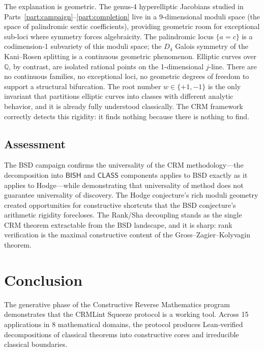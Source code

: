 \documentclass[11pt]{article}
\theoremstyle{plain}
\theoremstyle{definition}
\theoremstyle{remark}
\newcommand{\QQ}{\mathbb{Q}}
\newcommand{\BISH}{\mathsf{BISH}}
\newcommand{\CLASS}{\mathsf{CLASS}}
\begin{document}
The explanation is geometric.  The genus-4 hyperelliptic Jacobians
studied in Parts~\ref{part:campaign}--\ref{part:completion} live in
a 9-dimensional moduli space (the space of palindromic sextic
coefficients), providing geometric room for exceptional sub-loci
where symmetry forces algebraicity.  The palindromic locus
$\{a = c\}$ is a codimension-1 subvariety of this moduli space;
the $D_4$ Galois symmetry of the Kani--Rosen splitting is a
continuous geometric phenomenon.  Elliptic curves over~$\QQ$, by
contrast, are isolated rational points on the 1-dimensional
$j$-line.  There are no continuous families, no exceptional loci,
no geometric degrees of freedom to support a structural
bifurcation.  The root number $w \in \{+1, -1\}$ is the only
invariant that partitions elliptic curves into classes with
different analytic behavior, and it is already fully understood
classically.  The CRM framework correctly detects this rigidity:
it finds nothing because there is nothing to find.

\subsection{Assessment}

The BSD campaign confirms the universality of the CRM
methodology---the decomposition into $\BISH$ and $\CLASS$
components applies to BSD exactly as it applies to Hodge---while
demonstrating that universality of method does not guarantee
universality of discovery.  The Hodge conjecture's rich moduli
geometry created opportunities for constructive shortcuts that the
BSD conjecture's arithmetic rigidity forecloses.  The Rank/Sha
decoupling stands as the single CRM theorem extractable from the
BSD landscape, and it is sharp: rank verification is the maximal
constructive content of the Gross--Zagier--Kolyvagin theorem.


\section{Conclusion}\label{sec:conclusion}

The generative phase of the Constructive Reverse Mathematics
program demonstrates that the CRMLint Squeeze protocol is a
working tool.  Across 15 applications in 8 mathematical domains,
the protocol produces Lean-verified decompositions of classical
theorems into constructive cores and irreducible classical
boundaries.
\end{document}
